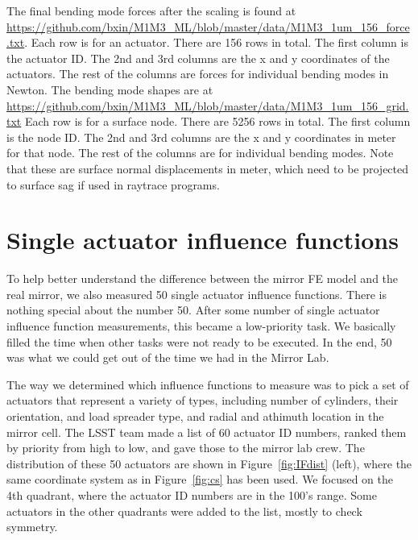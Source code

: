 \documentclass [twoside,openbib,12pt]{article}
\begin{document}
The final bending mode forces after the scaling is found at
\url{https://github.com/bxin/M1M3_ML/blob/master/data/M1M3_1um_156_force.txt}.
Each row is for an actuator. There are 156 rows in total.
The first column is the actuator ID. The 2nd and 3rd columns are the x
and y coordinates of the actuators. The rest of the columns are forces
for individual bending modes in Newton.
The bending mode shapes are at
\url{https://github.com/bxin/M1M3_ML/blob/master/data/M1M3_1um_156_grid.txt}
Each row is for a surface node. There are 5256 rows in total. The
first column is the node ID. The 2nd and 3rd columns are the x and y
coordinates in meter for that node. The rest of the columns are for
individual bending modes. Note that these are surface normal
displacements in meter, which need to be projected to surface sag if
used in raytrace programs.

\section{Single actuator influence functions}

To help better understand the difference between the mirror FE model
and the real mirror, we also measured 50 single actuator influence
functions. There is nothing special about the number 50. After some
number of single actuator influence function measurements, this
became a low-priority task. We basically filled the time when other
tasks were not ready to be executed.
In the end, 50 was what we could get out of the time we had in the
Mirror Lab.

The way we determined which influence functions to measure was to pick
a set of actuators that represent a variety of types, including number of
cylinders, their orientation, and load spreader type, and radial and
athimuth location in the mirror cell.
The LSST team made a list of 60 actuator ID numbers, ranked them by
priority from high to low, and gave those to the mirror lab crew.
The distribution of these 50 actuators are shown in
Figure~\ref{fig:IFdist} (left), where the same coordinate system as in
Figure~\ref{fig:cs} has been used. We focused on the 4th quadrant,
where the actuator ID numbers are in the 100's range.
Some actuators in the other quadrants were added to the list, mostly
to check symmetry.
\end{document}
